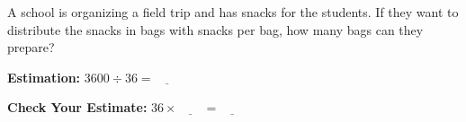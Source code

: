 \documentclass[letterpaper,12pt]{article} %
\begin{document}
\vspace{1em} %
\Large A school is organizing a field trip and has \underline{\hspace{2em}} snacks for the students. If they want to distribute the snacks in bags with \underline{\hspace{2em}} snacks per bag, how many bags can they prepare?

\vspace{1em} %
\Large \textbf{Estimation:}
\huge $ 3600 \div 36 = \underline{\hspace{2em}} $

\vspace{1em} %
\Large \textbf{Check Your Estimate:}
\huge $ 36 \times \underline{\hspace{2em}} = \underline{\hspace{2em}} $

\vfill
\end{document}
